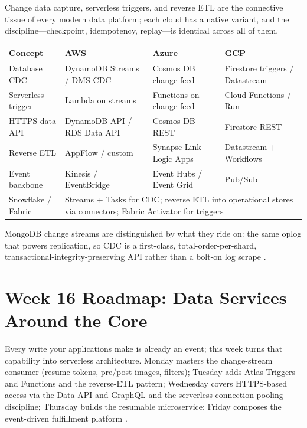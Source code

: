 \begin{crosscloud}
Change data capture, serverless triggers, and reverse ETL are the connective tissue of every modern data platform; each cloud has a native variant, and the discipline---checkpoint, idempotency, replay---is identical across all of them.

\vspace{2mm}
{\footnotesize
\begin{tabular}{@{}p{2.9cm}p{3.0cm}p{3.0cm}p{3.0cm}@{}} 
\toprule
\textbf{Concept} & \textbf{AWS} & \textbf{Azure} & \textbf{GCP} \\
\midrule
Database CDC & DynamoDB Streams / DMS CDC & Cosmos DB change feed & Firestore triggers / Datastream \\
Serverless trigger & Lambda on streams & Functions on change feed & Cloud Functions / Run \\
HTTPS data API & DynamoDB API / RDS Data API & Cosmos DB REST & Firestore REST \\
Reverse ETL & AppFlow / custom & Synapse Link + Logic Apps & Datastream + Workflows \\
Event backbone & Kinesis / EventBridge & Event Hubs / Event Grid & Pub/Sub \\
\addlinespace
Snowflake / Fabric & \multicolumn{3}{l}{Streams + Tasks for CDC; reverse ETL into operational stores via connectors; Fabric Activator for triggers} \\
\bottomrule
\end{tabular}}

\vspace{1mm}
MongoDB change streams are distinguished by what they ride on: the same oplog that powers replication, so CDC is a first-class, total-order-per-shard, transactional-integrity-preserving API rather than a bolt-on log scrape \cite{mongodbChangeStreamsDocs,mongodbOplogDocs}.
\end{crosscloud}

\section{Week 16 Roadmap: Data Services Around the Core}
Every write your applications make is already an event; this week turns that capability into serverless architecture. Monday masters the change-stream consumer (resume tokens, pre/post-images, filters); Tuesday adds Atlas Triggers and Functions and the reverse-ETL pattern; Wednesday covers HTTPS-based access via the Data API and GraphQL and the serverless connection-pooling discipline; Thursday builds the resumable microservice; Friday composes the event-driven fulfillment platform \cite{mongodbChangeStreamsDocs}.

